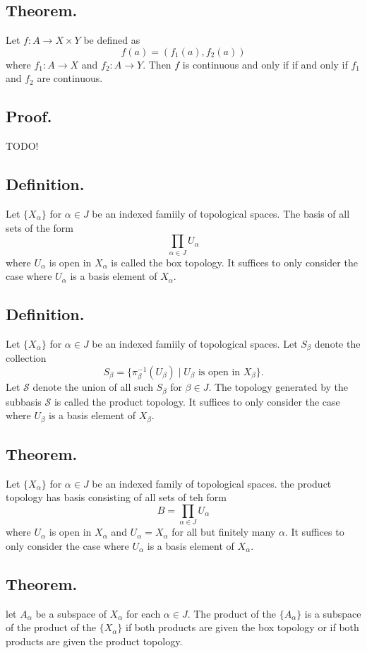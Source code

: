 \documentclass[titlepage]{article}
\begin{document}
\subsection{Theorem.} Let $f: A \to X \times Y$ be defined as 
$$f(a) = (f_{1}(a), f_{2}(a))$$
where $f_{1}: A \to X$ and $f_{2}: A \to Y$. Then $f$ is continuous and only if if and only if $f_{1}$ and $f_{2}$ are continuous.

\subsection{Proof.} TODO!

\subsection{Definition.} Let $\{X_{\alpha}\}$ for $\alpha \in J$ be an indexed famiily of topological spaces. The basis of all sets of the form 
$$\prod_{\alpha \in J} U_{\alpha}$$
where $U_{\alpha}$ is open in $X_{\alpha}$ is called the box topology. It suffices to only consider the case where $U_{\alpha}$ is a basis element of $X_{\alpha}$.

\subsection{Definition.} Let $\{X_{\alpha}\}$ for $\alpha \in J$ be an indexed famiily of topological spaces. Let $S_{\beta}$ denote the collection 
$$S_{\beta} = \{\pi_{\beta}^{-1}(U_{\beta}) \mid U_{\beta} \text{ is open in } X_{\beta}\}.$$
Let $\mathcal{S}$ denote the union of all such $S_{\beta}$ for $\beta \in J$. The topology generated by the subbasis $\mathcal{S}$ is called the product topology. It suffices to only consider the case where $U_{\beta}$ is a basis element of $X_{\beta}$.

\subsection{Theorem.} Let $\{X_{\alpha}\}$ for $\alpha \in J$ be an indexed family of topological spaces. the product topology has basis consisting of all sets of teh form 
$$B = \prod_{\alpha \in J} U_{\alpha}$$
where $U_{\alpha}$ is open in $X_{\alpha}$ and $U_{\alpha} = X_{\alpha}$ for all but finitely many $\alpha$. It suffices to only consider the case where $U_{\alpha}$ is a basis element of $X_{\alpha}$.

\subsection{Theorem.} let $A_{\alpha}$ be a subspace of $X_{\alpha}$ for each $\alpha \in J$. The product of the $\{A_{\alpha}\}$ is a subspace of the product of the $\{X_{\alpha}\}$ if both products are given the box topology or if both products are given the product topology.
\end{document}
